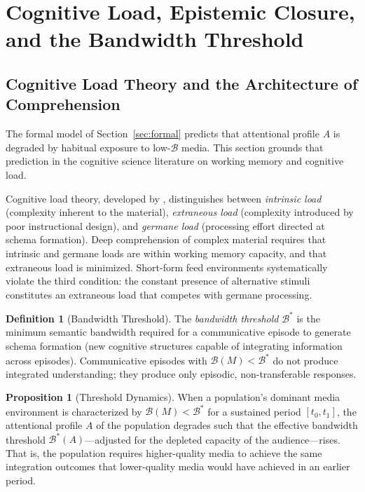 \documentclass[12pt]{article}
\theoremstyle{definition}
\newtheorem{definition}{Definition}[section]
\newtheorem{proposition}{Proposition}[section]
\theoremstyle{plain}
\begin{document}
\section{Cognitive Load, Epistemic Closure, and the Bandwidth Threshold}
\label{sec:cogload}

\subsection{Cognitive Load Theory and the Architecture of Comprehension}

The formal model of Section~\ref{sec:formal} predicts that attentional profile $A$ is degraded by habitual exposure to low-$\mathcal{B}$ media. This section grounds that prediction in the cognitive science literature on working memory and cognitive load.

Cognitive load theory, developed by \citet{Sweller1988}, distinguishes between \emph{intrinsic load} (complexity inherent to the material), \emph{extraneous load} (complexity introduced by poor instructional design), and \emph{germane load} (processing effort directed at schema formation). Deep comprehension of complex material requires that intrinsic and germane loads are within working memory capacity, and that extraneous load is minimized. Short-form feed environments systematically violate the third condition: the constant presence of alternative stimuli constitutes an extraneous load that competes with germane processing.

\begin{definition}[Bandwidth Threshold]
The \emph{bandwidth threshold} $\mathcal{B}^*$ is the minimum semantic bandwidth required for a communicative episode to generate schema formation (new cognitive structures capable of integrating information across episodes). Communicative episodes with $\mathcal{B}(M) < \mathcal{B}^*$ do not produce integrated understanding; they produce only episodic, non-transferable responses.
\end{definition}

\begin{proposition}[Threshold Dynamics]
When a population's dominant media environment is characterized by $\mathcal{B}(M) < \mathcal{B}^*$ for a sustained period $[t_0, t_1]$, the attentional profile $A$ of the population degrades such that the effective bandwidth threshold $\mathcal{B}^*(A)$---adjusted for the depleted capacity of the audience---rises. That is, the population requires higher-quality media to achieve the same integration outcomes that lower-quality media would have achieved in an earlier period.
\end{proposition}
\end{document}
